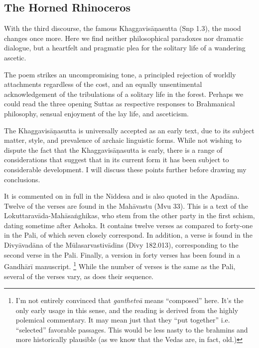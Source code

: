\documentclass[12pt,openany]{book}%
\begin{document}
\subsection*{The Horned Rhinoceros}

With the third discourse, the famous \textsanskrit{Khaggavisāṇasutta} (Snp 1.3), the mood changes once more. Here we find neither philosophical paradoxes nor dramatic dialogue, but a heartfelt and pragmatic plea for the solitary life of a wandering ascetic.

The poem strikes an uncompromising tone, a principled rejection of worldly attachments regardless of the cost, and an equally unsentimental acknowledgement of the tribulations of a solitary life in the forest. Perhaps we could read the three opening Suttas as respective responses to Brahmanical philosophy, sensual enjoyment of the lay life, and asceticism.

The \textsanskrit{Khaggavisāṇasutta} is universally accepted as an early text, due to its subject matter, style, and prevalence of archaic linguistic forms. While not wishing to dispute the fact that the \textsanskrit{Khaggavisāṇasutta} is early, there is a range of considerations that suggest that in its current form it has been subject to considerable development. I will discuss these points further before drawing my conclusions.

It is commented on in full in the Niddesa and is also quoted in the \textsanskrit{Apadāna}. Twelve of the verses are found in the \textsanskrit{Mahāvastu} (Mvu 33). This is a text of the \textsanskrit{Lokuttaravāda}-\textsanskrit{Mahāsaṅghikas}, who stem from the other party in the first schism, dating sometime after Ashoka. It contains twelve verses as compared to forty-one in the Pali, of which seven closely correspond. In addition, a verse is found in the \textsanskrit{Divyāvadāna} of the \textsanskrit{Mūlasarvastivādins} (Divy 182.013), corresponding to the second verse in the Pali. Finally, a version in forty verses has been found in a \textsanskrit{Gandhārī} manuscript. \footnote{I’m not entirely convinced that \textit{\textsanskrit{ganthetvā}} means “composed” here. It’s the only early usage in this sense, and the reading is derived from the highly polemical commentary. It may mean just that they “put together” i.e. “selected” favorable passages. This would be less nasty to the brahmins and more historically plausible (as we know that the Vedas are, in fact, old.) } While the number of verses is the same as the Pali, several of the verses vary, as does their sequence.
\end{document}
